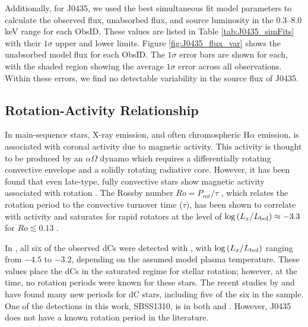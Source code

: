 \documentclass[twocolumn, tighten, times, astrosymb]{aastex631}
\begin{document}
Additionally, for J0435, we used the best simultaneous fit model parameters to calculate the observed flux, unabsorbed flux, and source luminosity in the $0.3$--$8.0$\,keV range for each ObsID. These values are listed in Table \ref{tab:J0435_simFits} with their $1\sigma$ upper and lower limits. Figure \ref{fig:J0435_flux_var} shows the unabsorbed model flux for each ObsID. The $1\sigma$ error bars are shown for each, with the shaded region showing the average $1\sigma$ error across all  observations. Within these errors, we find no detectable variability in the source flux of J0435. 

\subsection{Rotation-Activity Relationship}\label{sec:rotation}

In main-sequence stars, X-ray emission, and often chromospheric H$\alpha$ emission, is associated with coronal activity due to magnetic activity. This activity is thought to be produced by an $\alpha\Omega$ dynamo \citep{Parker1955} which requires a differentially rotating convective envelope and a solidly rotating radiative core. However, it has been found that even late-type, fully convective stars show magnetic activity associated with rotation \citep{Wright2018}. The Rossby number $Ro = P_{rot}/\tau$ \citep{Noyes1984}, which relates the rotation period to the convective turnover time ($\tau$), has been shown to correlate with activity and saturates for rapid rotators at the level of  $\log{(\LxLbol)} \approx -3.3$ for $Ro \lesssim 0.13$ \citep{Micela1985, Wright2011}. 

In \citet{Green2019}, all six of the observed dCs were detected with \Chandra, with $\log{(\LxLbol)}$ ranging from $-4.5$ to  $-3.2$, depending on the assumed model plasma temperature. These values place the dCs in the saturated regime for stellar rotation; however, at the time, no rotation periods were known for these stars. The recent studies by \citet{Roulston2021a} and \citet{Whitehouse2021} have found many new periods for dC stars, including five of the six in the \citet{Green2019} sample. One of the detections in this work, SBSS1310, is in both  \citet{Roulston2021a} and \citet{Whitehouse2021}. However, J0435 does not have a known rotation period in the literature. 
\end{document}
